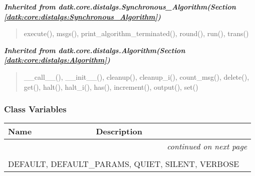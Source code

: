 \large{\textbf{\textit{Inherited from datk.core.distalgs.Synchronous\_Algorithm\textit{(Section \ref{datk:core:distalgs:Synchronous_Algorithm})}}}}

\begin{quote}
execute(), msgs(), print\_algorithm\_terminated(), round(), run(), trans()
\end{quote}

\large{\textbf{\textit{Inherited from datk.core.distalgs.Algorithm\textit{(Section \ref{datk:core:distalgs:Algorithm})}}}}

\begin{quote}
\_\_call\_\_(), \_\_init\_\_(), cleanup(), cleanup\_i(), count\_msg(), delete(), get(), halt(), halt\_i(), has(), increment(), output(), set()
\end{quote}


  \subsubsection{Class Variables}

    \vspace{-1cm}
\hspace{\varindent}\begin{longtable}{|p{\varnamewidth}|p{\vardescrwidth}|l}
\cline{1-2}
\cline{1-2} \centering \textbf{Name} & \centering \textbf{Description}& \\
\cline{1-2}
\endhead\cline{1-2}\multicolumn{3}{r}{\small\textit{continued on next page}}\\\endfoot\cline{1-2}
\endlastfoot\multicolumn{2}{|l|}{\textit{Inherited from datk.core.distalgs.Algorithm \textit{(Section \ref{datk:core:distalgs:Algorithm})}}}\\
\multicolumn{2}{|p{\varwidth}|}{\raggedright DEFAULT, DEFAULT\_PARAMS, QUIET, SILENT, VERBOSE}\\
\cline{1-2}
\end{longtable}



